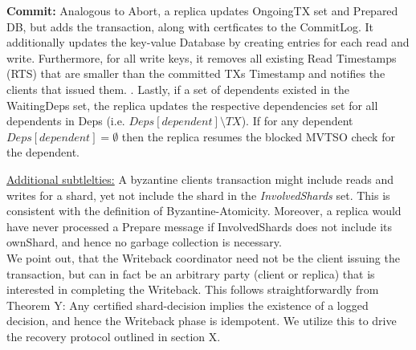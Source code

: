 \textbf{Commit:}
Analogous to Abort, a replica updates OngoingTX set and Prepared DB, but adds the transaction, along with certficates to the CommitLog. It additionally updates the key-value Database by creating entries for each read and write.  Furthermore, for all write keys, it removes all existing Read Timestamps (RTS) that are smaller than the committed TXs Timestamp and notifies the clients that issued them. . 
Lastly, if a set of dependents existed in the WaitingDeps set, the replica updates the respective dependencies set for all dependents in Deps (i.e. $Deps[dependent] \setminus TX$). If for any dependent $Deps[dependent] = \emptyset$ then the replica resumes the blocked MVTSO check for the dependent.



\underline{Additional subtlelties:} A byzantine clients transaction might include reads and writes for a shard, yet not include the shard in the \textit{InvolvedShards} set. This is consistent with the definition of Byzantine-Atomicity. Moreover, a replica would have never processed a Prepare message if InvolvedShards does not include its ownShard, and hence no garbage collection is necessary.\\

We point out, that the Writeback coordinator need not be the client issuing the transaction, but can in fact be an arbitrary party (client or replica) that is interested in completing the Writeback. This follows straightforwardly from Theorem Y: Any certified shard-decision implies the existence of a logged decision, and hence the Writeback phase is idempotent.
We utilize this to drive the recovery protocol outlined in section X. 



